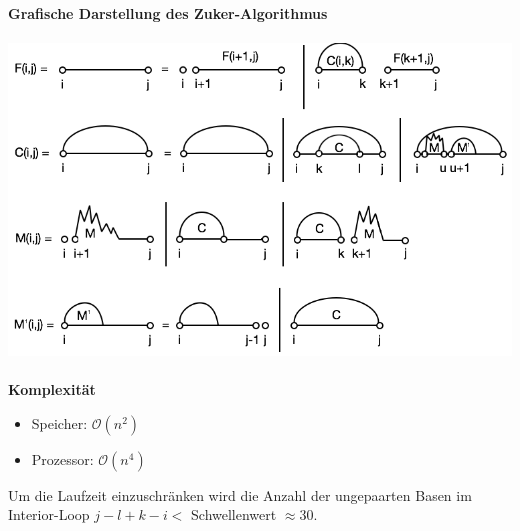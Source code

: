 \paragraph{}
 \textbf{Grafische Darstellung des Zuker-Algorithmus}\\\\
\includegraphics[scale=0.55]{lectures/160404_2/pix/zuker}
\paragraph{}
 \textbf{Komplexit\"at}
\begin{itemize}
	\item[] Speicher: $\mathcal{O}(n^2)$
	\item[] Prozessor: $\mathcal{O}(n^4)$
\end{itemize}
Um die Laufzeit einzuschr\"anken wird die Anzahl der ungepaarten Basen im Interior-Loop $j-l+k-i<$ Schwellenwert $\approx 30$.